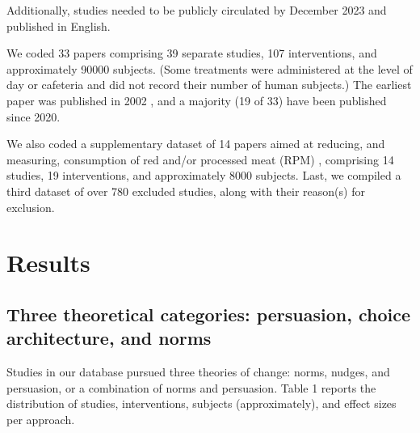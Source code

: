 \documentclass[sn-nature,pdflatex]{sn-jnl}
\begin{document}
Additionally, studies needed to be publicly circulated by December 2023
and published in English.

We coded 33 papers
\citep{aldoh2023, allen2002, alblas2023, coker2022, griesoph2021, piester2020, sparkman2017, sparkman2020, andersson2021, kanchanachitra2020, bochmann2017, bschaden2020, cooney2016, feltz2022, haile2021, mathur2021effectiveness, peacock2017, polanco2022, sparkman2021, abrahamse2007, acharya2004, berndsen2005, bertolaso2015, bianchi2022, fehrenbach2015, hatami2018, jalil2023, merrill2009, norris2014, weingarten2022, carfora2023, hennessy2016, mattson2020}
comprising 39 separate studies, 107 interventions, and approximately
90000 subjects. (Some treatments were administered at the level of day
or cafeteria and did not record their number of human subjects.) The
earliest paper was published in 2002 \citep{allen2002}, and a majority
(19 of 33) have been published since 2020.

We also coded a supplementary dataset of 14 papers aimed at reducing,
and measuring, consumption of red and/or processed meat (RPM)
\citep{carfora2017correlational, carfora2017randomised, carfora2019, carfora2019informational, delichatsios2001, dijkstra2022, emmons2005cancer, emmons2005project, jaacks2014, james2015, lee2018, perino2022, schatzkin2000, sorensen2005},
comprising 14 studies, 19 interventions, and approximately 8000
subjects. Last, we compiled a third dataset of over 780 excluded
studies, along with their reason(s) for exclusion.

\section{Results}\label{sec2}

\subsection{Three theoretical categories: persuasion, choice
architecture, and norms}\label{sec2.1}

Studies in our database pursued three theories of change: norms, nudges,
and persuasion, or a combination of norms and persuasion. Table 1
reports the distribution of studies, interventions, subjects
(approximately), and effect sizes per approach.
\end{document}
